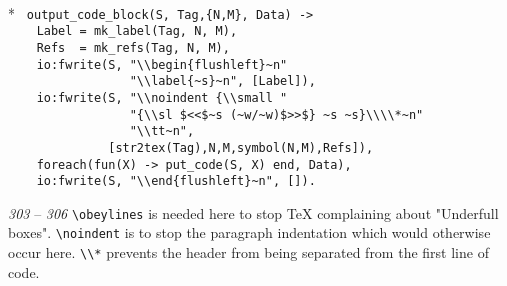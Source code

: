 \begin{flushleft}
\label{eweave_8_14}
\\*
\tt
\noindent{}%
\verb&output_code_block(S, Tag,{N,M}, Data) ->&\\
\noindent{}%
\verb&    Label = mk_label(Tag, N, M),&\\
\noindent{}%
\verb&    Refs  = mk_refs(Tag, N, M),&\\
\noindent{}%
\verb&    io:fwrite(S, "\\begin{flushleft}~n"&\\
\noindent{}%
\verb&                 "\\label{~s}~n", [Label]),&\\
\noindent{}%
\verb&    io:fwrite(S, "\\noindent {\\small "&\\
\noindent{}%
\verb&                 "{\\sl $<<$~s (~w/~w)$>>$} ~s ~s}\\\\*~n"&\\
\noindent{}%
\verb&                 "\\tt~n",&\\
\noindent{}%
\verb&              [str2tex(Tag),N,M,symbol(N,M),Refs]),&\\
\noindent{}%
\verb&    foreach(fun(X) -> put_code(S, X) end, Data),&\\
\noindent{}%
\verb&    io:fwrite(S, "\\end{flushleft}~n", []).&\\
\end{flushleft}

{\sl 303} -- {\sl 306} \verb+\obeylines+ is needed here to stop \TeX{}
complaining about "Underfull boxes". \verb+\noindent+ is to stop the
paragraph indentation which would otherwise occur here. \verb+\\*+
prevents the header from being separated from the first line of code.

